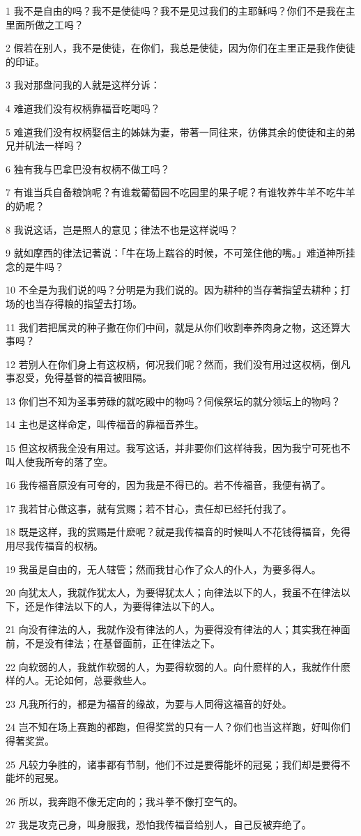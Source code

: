 \par 1 我不是自由的吗？我不是使徒吗？我不是见过我们的主耶稣吗？你们不是我在主里面所做之工吗？
\par 2 假若在别人，我不是使徒，在你们，我总是使徒，因为你们在主里正是我作使徒的印证。
\par 3 我对那盘问我的人就是这样分诉：
\par 4 难道我们没有权柄靠福音吃喝吗？
\par 5 难道我们没有权柄娶信主的姊妹为妻，带著一同往来，彷佛其余的使徒和主的弟兄并矶法一样吗？
\par 6 独有我与巴拿巴没有权柄不做工吗？
\par 7 有谁当兵自备粮饷呢？有谁栽葡萄园不吃园里的果子呢？有谁牧养牛羊不吃牛羊的奶呢？
\par 8 我说这话，岂是照人的意见；律法不也是这样说吗？
\par 9 就如摩西的律法记著说：「牛在场上踹谷的时候，不可笼住他的嘴。」难道神所挂念的是牛吗？
\par 10 不全是为我们说的吗？分明是为我们说的。因为耕种的当存著指望去耕种；打场的也当存得粮的指望去打场。
\par 11 我们若把属灵的种子撒在你们中间，就是从你们收割奉养肉身之物，这还算大事吗？
\par 12 若别人在你们身上有这权柄，何况我们呢？然而，我们没有用过这权柄，倒凡事忍受，免得基督的福音被阻隔。
\par 13 你们岂不知为圣事劳碌的就吃殿中的物吗？伺候祭坛的就分领坛上的物吗？
\par 14 主也是这样命定，叫传福音的靠福音养生。
\par 15 但这权柄我全没有用过。我写这话，并非要你们这样待我，因为我宁可死也不叫人使我所夸的落了空。
\par 16 我传福音原没有可夸的，因为我是不得已的。若不传福音，我便有祸了。
\par 17 我若甘心做这事，就有赏赐；若不甘心，责任却已经托付我了。
\par 18 既是这样，我的赏赐是什麽呢？就是我传福音的时候叫人不花钱得福音，免得用尽我传福音的权柄。
\par 19 我虽是自由的，无人辖管；然而我甘心作了众人的仆人，为要多得人。
\par 20 向犹太人，我就作犹太人，为要得犹太人；向律法以下的人，我虽不在律法以下，还是作律法以下的人，为要得律法以下的人。
\par 21 向没有律法的人，我就作没有律法的人，为要得没有律法的人；其实我在神面前，不是没有律法；在基督面前，正在律法之下。
\par 22 向软弱的人，我就作软弱的人，为要得软弱的人。向什麽样的人，我就作什麽样的人。无论如何，总要救些人。
\par 23 凡我所行的，都是为福音的缘故，为要与人同得这福音的好处。
\par 24 岂不知在场上赛跑的都跑，但得奖赏的只有一人？你们也当这样跑，好叫你们得著奖赏。
\par 25 凡较力争胜的，诸事都有节制，他们不过是要得能坏的冠冕；我们却是要得不能坏的冠冕。
\par 26 所以，我奔跑不像无定向的；我斗拳不像打空气的。
\par 27 我是攻克己身，叫身服我，恐怕我传福音给别人，自己反被弃绝了。

